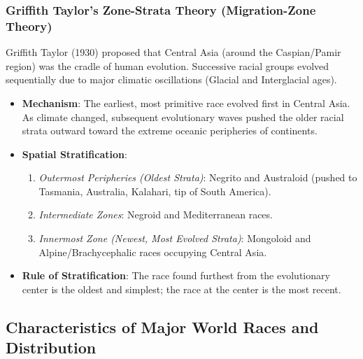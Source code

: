 \documentclass[11pt,a4paper]{article}
\begin{document}
\subsubsection{Griffith Taylor's Zone-Strata Theory (Migration-Zone Theory)}
\begin{modelbox}
Griffith Taylor (1930) proposed that Central Asia (around the Caspian/Pamir region) was the cradle of human evolution. Successive racial groups evolved sequentially due to major climatic oscillations (Glacial and Interglacial ages).
\end{modelbox}

\begin{itemize}[leftmargin=*]
  \item \textbf{Mechanism}: The earliest, most primitive race evolved first in Central Asia. As climate changed, subsequent evolutionary waves pushed the older racial strata outward toward the extreme oceanic peripheries of continents.
  \item \textbf{Spatial Stratification}:
  \begin{enumerate}
    \item \textit{Outermost Peripheries (Oldest Strata)}: Negrito and Australoid (pushed to Tasmania, Australia, Kalahari, tip of South America).
    \item \textit{Intermediate Zones}: Negroid and Mediterranean races.
    \item \textit{Innermost Zone (Newest, Most Evolved Strata)}: Mongoloid and Alpine/Brachycephalic races occupying Central Asia.
  \end{enumerate}
  \item \textbf{Rule of Stratification}: The race found furthest from the evolutionary center is the oldest and simplest; the race at the center is the most recent.
\end{itemize}

\subsection{Characteristics of Major World Races and Distribution}
\end{document}
